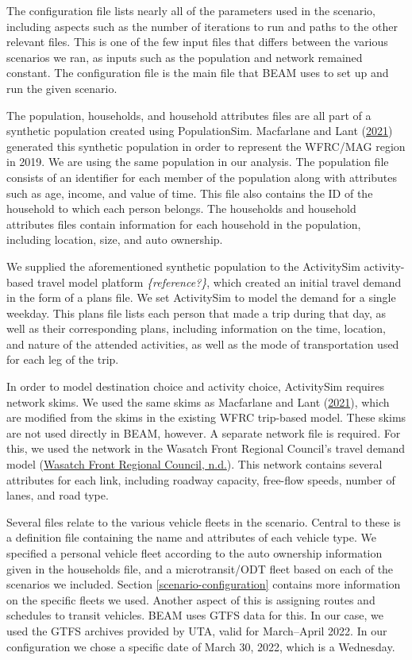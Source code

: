 \documentclass[
]{report}
\begin{document}
The configuration file lists nearly all of the parameters used in the scenario, including aspects such as the number of iterations to run and paths to the other relevant files. This is one of the few input files that differs between the various scenarios we ran, as inputs such as the population and network remained constant. The configuration file is the main file that BEAM uses to set up and run the given scenario.

The population, households, and household attributes files are all part of a synthetic population created using PopulationSim. Macfarlane and Lant (\protect\hyperlink{ref-MacfarlaneLant}{2021}) generated this synthetic population in order to represent the WFRC/MAG region in 2019. We are using the same population in our analysis. The population file consists of an identifier for each member of the population along with attributes such as age, income, and value of time. This file also contains the ID of the household to which each person belongs. The households and household attributes files contain information for each household in the population, including location, size, and auto ownership.

We supplied the aforementioned synthetic population to the ActivitySim activity-based travel model platform \emph{\{reference?\}}, which created an initial travel demand in the form of a plans file. We set ActivitySim to model the demand for a single weekday. This plans file lists each person that made a trip during that day, as well as their corresponding plans, including information on the time, location, and nature of the attended activities, as well as the mode of transportation used for each leg of the trip.

In order to model destination choice and activity choice, ActivitySim requires network skims. We used the same skims as Macfarlane and Lant (\protect\hyperlink{ref-MacfarlaneLant}{2021}), which are modified from the skims in the existing WFRC trip-based model. These skims are not used directly in BEAM, however. A separate network file is required. For this, we used the network in the Wasatch Front Regional Council's travel demand model (\protect\hyperlink{ref-WFRCnetwork}{Wasatch Front Regional Council, n.d.}). This network contains several attributes for each link, including roadway capacity, free-flow speeds, number of lanes, and road type.

Several files relate to the various vehicle fleets in the scenario. Central to these is a definition file containing the name and attributes of each vehicle type. We specified a personal vehicle fleet according to the auto ownership information given in the households file, and a microtransit/ODT fleet based on each of the scenarios we included. Section \ref{scenario-configuration} contains more information on the specific fleets we used. Another aspect of this is assigning routes and schedules to transit vehicles. BEAM uses GTFS data for this. In our case, we used the GTFS archives provided by UTA, valid for March--April 2022. In our configuration we chose a specific date of March 30, 2022, which is a Wednesday.
\end{document}
